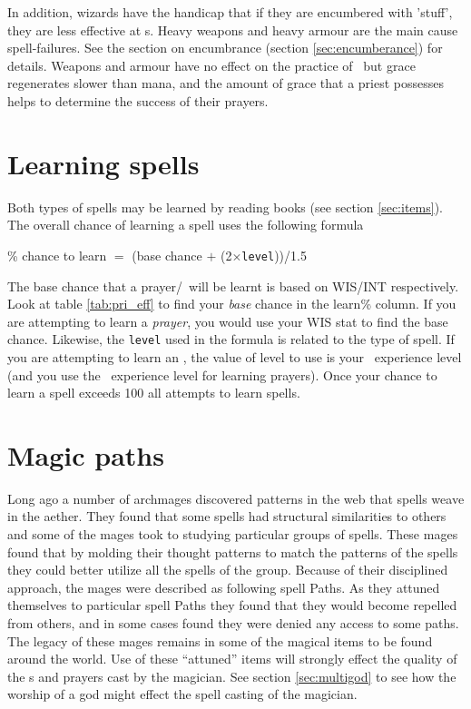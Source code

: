 {{In addition, wizards
have the handicap that if they are encumbered with 'stuff', they are
less effective at \incantation s.  Heavy weapons and
heavy armour are the main cause spell-failures. See the section
on encumbrance (section \ref{sec:encumberance}) for details.
Weapons and armour have no effect on the practice of \divinemagic\
but grace regenerates slower than mana, and the amount of grace
that a priest possesses helps to determine the success of their
prayers.

\section{Learning spells}\label{sec:spell_learn}

Both types of spells may be learned by reading books (see section
\ref{sec:items}).
The overall chance of learning a spell uses the following formula \\
\begin{center}
\% chance to learn $=$ (base chance $+$ (2$\times${\tt level}))/1.5 \\
\end{center}
The base chance that a prayer/\incantation\ will be learnt is based on WIS/INT
respectively. Look at table \ref{tab:pri_eff} to find your {\em base}
chance in the learn\% column. If you are attempting to learn a {\em prayer},
you would use your WIS stat to find the base chance. Likewise, the {\tt level}
used in the formula is related to the type of spell. If you are attempting
to learn an \incantation , the value of level to use is your \mage\ experience
level (and you use the \priest\ experience level for learning prayers).
Once your chance to learn a spell exceeds 100%
all attempts to learn spells.


\section{Magic paths} \label{sec:magicpath}

Long ago a number of archmages discovered patterns in the web that spells
weave in the aether. They found that some spells had structural similarities
to others and some of the mages took to studying particular groups of spells.
These mages found that by molding their thought patterns to match the patterns
of the spells they could better utilize all the spells of the group. Because
of their disciplined approach, the mages were described as following spell
Paths. As they attuned themselves to particular spell Paths they found that
they would become repelled from others, and in some cases found they were
denied any access to some paths. The legacy of these mages remains in some
of the magical items to be found around the world. Use of these ``attuned''
items will strongly effect the quality of the \incantation s and prayers cast by
the magician. See section \ref{sec:multigod} to see how the worship of
a god might effect the spell casting of the magician.


}}
